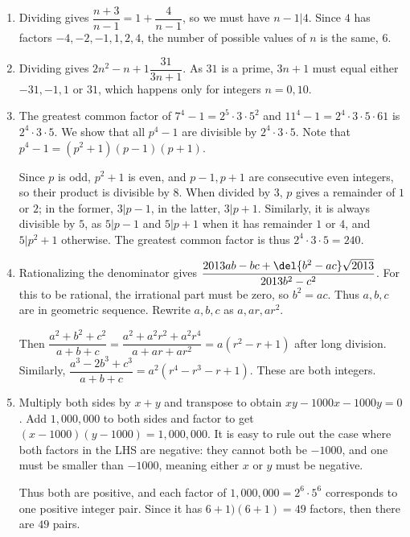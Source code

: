 \documentclass[10pt,paper=letter]{scrartcl}
\begin{document}
\begin{enumerate}

\item Dividing gives $\dfrac{n+3}{n-1} = 1 + \dfrac4{n-1}$, so we must have $n-1|4$. Since $4$ has factors $-4, -2, -1, 1, 2, 4$, the number of possible values of $n$ is the same, $6$.

\item Dividing gives $2n^2 - n + 1 \dfrac{31}{3n + 1}$. As $31$ is a prime, $3n + 1$ must equal either $-31, -1, 1$ or $31$, which happens only for integers $n = 0, 10$.

\item The greatest common factor of $7^4 - 1 = 2^5 \cdot 3 \cdot 5^2$ and $11^4 - 1 = 2^4 \cdot 3 \cdot 5 \cdot 61$ is $2^4 \cdot 3 \cdot 5$. We show that all $p^4 - 1$ are divisible by $2^4 \cdot 3 \cdot 5$. Note that $p^4 - 1 = (p^2 + 1)(p - 1)(p + 1)$.

Since $p$ is odd, $p^2 + 1$ is even, and $p-1, p+1$ are consecutive even integers, so their product is divisible by $8$. When divided by $3$, $p$ gives a remainder of $1$ or $2$; in the former, $3|p-1$, in the latter, $3|p+1$. Similarly, it is always divisible by $5$, as $5|p-1$ and $5|p+1$ when it has remainder $1$ or $4$, and $5|p^2 + 1$ otherwise. The greatest common factor is thus $2^4 \cdot 3 \cdot 5 = 240$.

\item Rationalizing the denominator gives $\dfrac{2013ab - bc + \del{b^2 - ac}\sqrt{2013}}{2013b^2 - c^2}$. For this to be rational, the irrational part must be zero, so $b^2 = ac$. Thus $a, b, c$ are in geometric sequence. Rewrite $a, b, c$ as $a, ar, ar^2$.

Then $\dfrac{a^2 + b^2 + c^2}{a + b + c} = \dfrac{a^2 + a^2r^2 + a^2r^4}{a + ar + ar^2} = a(r^2 - r + 1)$ after long division. Similarly, $\dfrac{a^3 - 2b^3 + c^3}{a + b + c} = a^2(r^4 - r^3 - r + 1)$. These are both integers.

\item Multiply both sides by $x+y$ and transpose to obtain $xy - 1000x - 1000y = 0$. Add $1{,}000{,}000$ to both sides and factor to get $(x - 1000)(y - 1000) = 1{,}000{,}000$. It is easy to rule out the case where both factors in the LHS are negative: they cannot both be $-1000$, and one must be smaller than $-1000$, meaning either $x$ or $y$ must be negative.

Thus both are positive, and each factor of $1{,}000{,}000 = 2^6\cdot 5^6$ corresponds to one positive integer pair. Since it has $6+1)(6+1) = 49$ factors, then there are $49$ pairs.


\end{enumerate}
\end{document}
